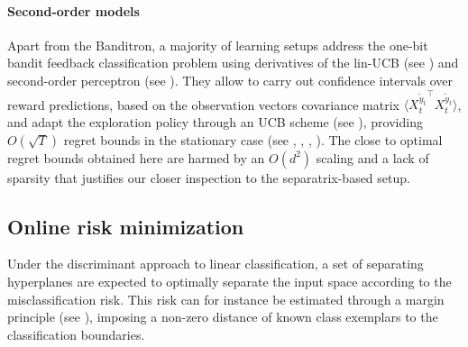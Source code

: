 \documentclass[preprint,12pt,authoryear]{elsarticle}
\begin{document}
\paragraph{Second-order models} 
Apart from the Banditron, a majority of learning setups address the one-bit bandit feedback classification problem using derivatives of the lin-UCB  (see \cite{auer2002using}) and second-order perceptron (see \cite{cesa2005second}). They allow to carry out confidence intervals over reward predictions, based on the observation vectors covariance matrix $\langle{X_t^{\tilde{y}_t}}^\top {X_t^{\tilde{y}_t}}\rangle$, and adapt the exploration policy through an UCB scheme (see \cite{lai1985asymptotically}), providing $O(\sqrt{T})$ regret bounds in the stationary case (see \cite{li2010contextual}, \cite{hazan2011newtron}, \cite{crammer2013multiclass}, \cite{ngo2013upper}).
The close to optimal regret bounds obtained here are harmed by an $O(d^2)$ scaling and a lack of sparsity that justifies our closer inspection to the separatrix-based setup.




\subsection{Online risk minimization}
Under the discriminant approach to linear classification, a set of separating hyperplanes are expected to optimally separate the input space according to the misclassification risk. This risk can for instance be estimated through a margin principle (see \cite{vapnik1998statistical}), imposing a non-zero distance of known class exemplars to the classification boundaries. 
\end{document}
